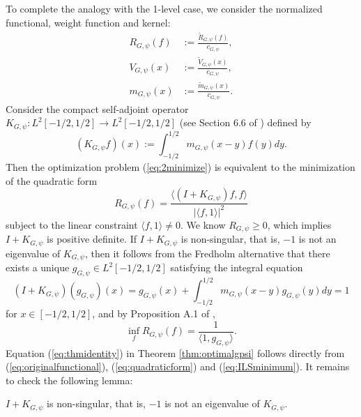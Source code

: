To complete the analogy with the 1-level case, we consider the normalized functional, weight function and kernel:
	\begin{align}
		R_{G, \psi} (f) &:= \frac{\tilde R_{G, \psi}(f)}{c_{G, \psi}}, \label{eq:quadraticform} \\
		V_{G, \psi} (x) &:= \frac{\tilde V_{G, \psi} (x)}{c_{G, \psi}}, \\
		m_{G, \psi} (x) &:= \frac{\tilde m_{G, \psi} (x)}{c_{G, \psi}}. 
	\end{align}	
Consider the compact self-adjoint operator $K_{G, \psi} :L^2 [-1/2, 1/2] \to L^2 [-1/2, 1/2]$ (see Section 6.6 of \cite{RudnickSarnak}) defined by 
	\begin{equation}
		(K_{G, \psi} f) (x) := \int_{-1/2}^{1/2} m_{G, \psi} (x - y) f(y) dy. 
	\end{equation}	
Then the optimization problem (\ref{eq:2minimize}) is equivalent to the minimization of the quadratic form
    \begin{equation}
    		R_{G, \psi} (f) = \frac{\langle (I + K_{G, \psi})f, f \rangle}{|\langle f, 1 \rangle|^2} 
    	\end{equation}	
subject to the linear constraint $\langle f, 1 \rangle \neq 0$. We know $R_{G, \psi} \geq 0$, which implies $I + K_{G, \psi}$ is positive definite. If $I + K_{G, \psi}$ is non-singular, that is, $-1$ is not an eigenvalue of $K_{G, \psi}$, then it follows from the Fredholm alternative that there exists a unique $g_{G, \psi} \in L^2 [-1/2, 1/2]$ satisfying the integral equation
	\begin{equation}
			(I + K_{G, \psi}) (g_{G, \psi}) (x) = g_{G, \psi} (x) + \int_{-1/2}^{1/2} m_{G, \psi} (x - y) g_{G, \psi} (y) dy = 1 \label{eq:fredholm}
	\end{equation}	
for $x \in [-1/2, 1/2]$, and by Proposition A.1 of \cite{ILS}, 
	\begin{equation}
		\inf_f R_{G, \psi} (f) = \frac{1}{\langle 1, g_{G, \psi} \rangle}. \label{eq:ILSminimum}
	\end{equation}	
Equation (\ref{eq:thmidentity})	in Theorem \ref{thm:optimalgpsi} follows directly from (\ref{eq:originalfunctional}), (\ref{eq:quadraticform}) and (\ref{eq:ILSminimum}). It remains to check the following lemma:

\begin{lemma}
	$I + K_{G, \psi}$ is non-singular, that is, $-1$ is not an eigenvalue of $K_{G, \psi}$. \label{lem:nonsingular}
\end{lemma}

